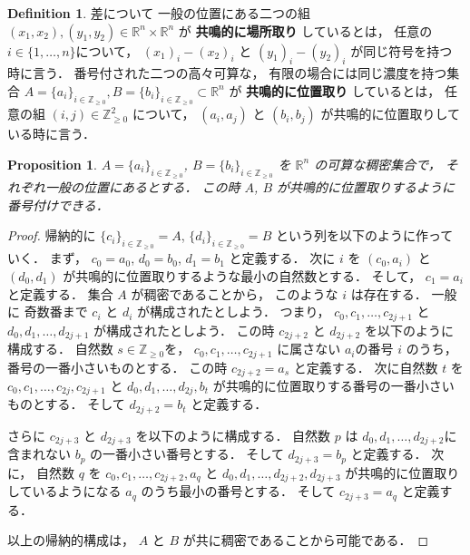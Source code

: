 \documentclass[leqno, a4paper, 12pt]{jsarticle}
\theoremstyle{plain}
\newtheorem{prop}[thm]{Proposition}
\theoremstyle{definition}
\newtheorem{df}{Definition}[section]
\theoremstyle{remark}
\newcommand{\zz}{\mathbb{Z}}
\newcommand{\rr}{\mathbb{R}}
\newcommand{\yoemph}[1]{\textbf{#1}}
\numberwithin{equation}{section}
\begin{document}
\begin{df}
差について
一般の位置にある二つの組
$(x_{1}, x_{2}), (y_{1},  y_{2})\in \rr^{n}\times \rr^{n}$
が
\textbf{共鳴的に場所取り}
しているとは，
任意の
$i\in \{1,\dots, n\}$について，
$(x_1)_{i}-(x_2)_{i}$
と
$(y_1)_{i}-(y_2)_{i}$
が同じ符号を持つ時に言う．
番号付された二つの高々可算な，
有限の場合には同じ濃度を持つ集合
$A=\{a_{i}\}_{i\in \zz_{\ge 0}},B=\{b_{i}\}_{i\in \zz_{\ge 0}}\subset \rr^{n}$
が
\yoemph{共鳴的に位置取り}
しているとは，
任意の組
$(i, j)\in \zz_{\ge 0}^{2}$
について，
$(a_{i}, a_{j})$
と
$(b_{i}, b_{j})$
が共鳴的に位置取りしている時に言う．
\end{df}

\begin{prop}\label{prop:sum:cdh:510}
$A=\{a_{i}\}_{i\in \zz_{\ge 0}}$,
$B=\{b_{i}\}_{i\in \zz_{\ge 0}}$
を
$\rr^{n}$
の可算な稠密集合で，
それぞれ一般の位置にあるとする．
この時
$A$,
$B$
が共鳴的に位置取りするように番号付けできる．
\end{prop}
\begin{proof}
帰納的に
$\{c_{i}\}_{i\in \zz_{\ge 0}}=A$, 
$\{d_i\}_{i\in \zz_{\ge 0}}=B$
という列を以下のように作っていく．
まず，
$c_{0}=a_{0}$, 
$d_{0}=b_{0}$, 
$d_{1}=b_{1}$
と定義する．
次に
$i$
を
$(c_{0},a_{i})$
と
$(d_{0},d_{1})$
が共鳴的に位置取りするような最小の自然数とする．
そして，
$c_{1}=a_{i}$と定義する．
集合
$A$
が稠密であることから，
このような
$i$
は存在する．
一般に
奇数番まで
$c_{i}$
と
$d_{i}$
が構成されたとしよう．
つまり，
$c_{0}, c_{1}, \dots, c_{2j+1}$
と
$d_{0},d_{1},\dots, d_{2j+1}$
が構成されたとしよう．
この時
$c_{2j+2}$
と
$d_{2j+2}$
を以下のように構成する．
自然数
$s\in \zz_{\ge 0}$を，
$c_{0},c_{1},\dots, c_{2j+1}$
に属さない
$a_{i}$の番号
$i$
のうち，
番号の一番小さいものとする．
この時
$c_{2j+2}=a_{s}$
と定義する．
次に自然数
$t$
を
$c_{0},c_{1},\dots, c_{2j}, c_{2j+1}$
と
$d_{0}, d_{1},  \dots, d_{2j}, b_{t}$
が共鳴的に位置取りする番号の一番小さいものとする．
そして
$d_{2j+2}=b_{t}$
と定義する．


さらに
$c_{2j+3}$
と
$d_{2j+3}$
を以下のように構成する．
自然数
$p$
は
$d_{0}, d_{1}, \dots, d_{2j+2}$に含まれない
$b_{p}$
の一番小さい番号とする．
そして
$d_{2j+3}=b_{p}$
と定義する．
次に，
自然数
$q$
を
$c_{0}, c_{1}, \dots, c_{2j+2}, a_{q}$
と
$d_{0}, d_{1}, \dots, d_{2j+2}, d_{2j+3}$
が共鳴的に位置取りしているようになる
$a_q$
のうち最小の番号とする．
そして
$c_{2j+3}=a_{q}$
と定義する．

以上の帰納的構成は，
$A$
と
$B$
が共に稠密であることから可能である．
\end{proof}
\end{document}
